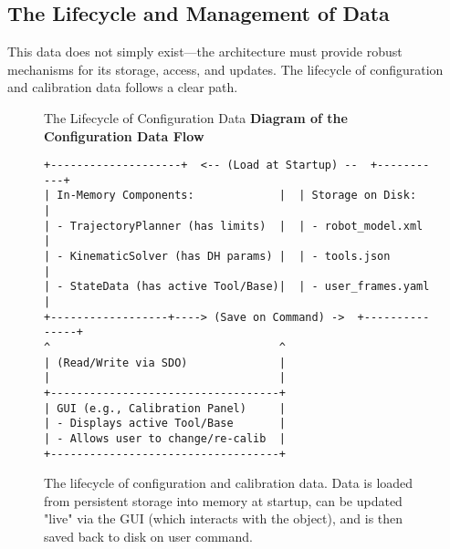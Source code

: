 
\subsection{The Lifecycle and Management of Data}
\label{subsec:data_lifecycle}

This data does not simply exist—the architecture must provide robust mechanisms for its storage, access, and updates. The lifecycle of configuration and calibration data follows a clear path.

\begin{figure}[h!]
    \centering
    \begin{infobox}{The Lifecycle of Configuration Data}
        \textbf{Diagram of the Configuration Data Flow}
        \begin{verbatim}
+--------------------+  <-- (Load at Startup) --  +-----------+
| In-Memory Components:             |  | Storage on Disk:     |
| - TrajectoryPlanner (has limits)  |  | - robot_model.xml    |
| - KinematicSolver (has DH params) |  | - tools.json         |
| - StateData (has active Tool/Base)|  | - user_frames.yaml   |
+------------------+----> (Save on Command) ->  +---------------+
^                                   ^
| (Read/Write via SDO)              |
|                                   |
+-----------------------------------+
| GUI (e.g., Calibration Panel)     |
| - Displays active Tool/Base       |
| - Allows user to change/re-calib  |
+-----------------------------------+
        \end{verbatim}
    \end{infobox}
    \caption{The lifecycle of configuration and calibration data. Data is loaded from persistent storage into memory at startup, can be updated "live" via the GUI (which interacts with the  object), and is then saved back to disk on user command.}
    \label{fig:config_data_flow}
\end{figure}

